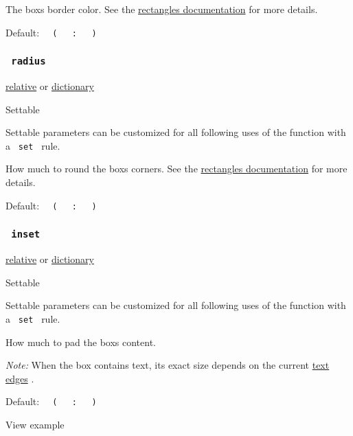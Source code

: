 The box\textquotesingle s border color. See the
\href{/docs/reference/visualize/rect/\#parameters-stroke}{rectangle\textquotesingle s
documentation} for more details.

Default:
\texttt{\ }{\texttt{\ (\ }}\texttt{\ }{\texttt{\ :\ }}\texttt{\ }{\texttt{\ )\ }}\texttt{\ }

\subsubsection{\texorpdfstring{\texttt{\ radius\ }}{ radius }}\label{parameters-radius}

\href{/docs/reference/layout/relative/}{relative} {or}
\href{/docs/reference/foundations/dictionary/}{dictionary}

{{ Settable }}

\label{parameters-radius-settable-tooltip}
Settable parameters can be customized for all following uses of the
function with a \texttt{\ set\ } rule.

How much to round the box\textquotesingle s corners. See the
\href{/docs/reference/visualize/rect/\#parameters-radius}{rectangle\textquotesingle s
documentation} for more details.

Default:
\texttt{\ }{\texttt{\ (\ }}\texttt{\ }{\texttt{\ :\ }}\texttt{\ }{\texttt{\ )\ }}\texttt{\ }

\subsubsection{\texorpdfstring{\texttt{\ inset\ }}{ inset }}\label{parameters-inset}

\href{/docs/reference/layout/relative/}{relative} {or}
\href{/docs/reference/foundations/dictionary/}{dictionary}

{{ Settable }}

\label{parameters-inset-settable-tooltip}
Settable parameters can be customized for all following uses of the
function with a \texttt{\ set\ } rule.

How much to pad the box\textquotesingle s content.

\emph{Note:} When the box contains text, its exact size depends on the
current \href{/docs/reference/text/text/\#parameters-top-edge}{text
edges} .

Default:
\texttt{\ }{\texttt{\ (\ }}\texttt{\ }{\texttt{\ :\ }}\texttt{\ }{\texttt{\ )\ }}\texttt{\ }


View example

